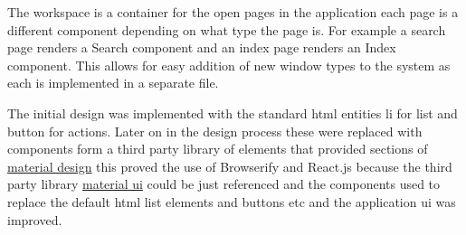 The workspace is a container for the open pages in the application each
page is a different component depending on what type the page is. For
example a search page renders a Search component and an index page
renders an Index component. This allows for easy addition of new window
types to the system as each is implemented in a separate file.

The initial design was implemented with the standard html entities li
for list and button for actions. Later on in the design process these
were replaced with components form a third party library of elements
that provided sections of
\href{https://design.google.com/spec/}{material design} this proved the
use of Browserify and React.js because the third party library
\href{http://www.material-ui.com/\#/}{material ui} could be just
referenced and the components used to replace the default html list
elements and buttons etc and the application ui was improved.
